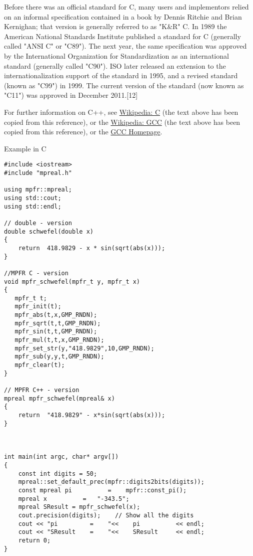 \vpara
Before there was an official standard for C, many users and implementors relied on an informal specification contained in a book by Dennis Ritchie and Brian Kernighan; that version is generally referred to as "K\&R" C. In 1989 the American National Standards Institute published a standard for C (generally called "ANSI C" or "C89"). The next year, the same specification was approved by the International Organization for Standardization as an international standard (generally called "C90"). ISO later released an extension to the internationalization support of the standard in 1995, and a revised standard (known as "C99") in 1999. The current version of the standard (now known as "C11") was approved in December 2011.[12]


\vpara
For further information on C++, see \href{http://en.wikipedia.org/wiki/C_(programming_language)}{Wikipedia: C} (the text above has been copied from this reference), or the  \href{http://en.wikipedia.org/wiki/GNU_Compiler_Collection}{Wikipedia: GCC} (the text above has been copied from this reference), or the  \href{http://gcc.gnu.org/}{GCC Homepage}.



\vpara
Example in C


\begin{lstlisting}
#include <iostream>
#include "mpreal.h"

using mpfr::mpreal;    
using std::cout;
using std::endl;

// double - version
double schwefel(double x)
{
    return  418.9829 - x * sin(sqrt(abs(x)));
}
 
//MPFR C - version
void mpfr_schwefel(mpfr_t y, mpfr_t x)
{
   mpfr_t t;
   mpfr_init(t);
   mpfr_abs(t,x,GMP_RNDN);
   mpfr_sqrt(t,t,GMP_RNDN);
   mpfr_sin(t,t,GMP_RNDN);
   mpfr_mul(t,t,x,GMP_RNDN);
   mpfr_set_str(y,"418.9829",10,GMP_RNDN);
   mpfr_sub(y,y,t,GMP_RNDN);
   mpfr_clear(t);
}

// MPFR C++ - version
mpreal mpfr_schwefel(mpreal& x)
{
    return  "418.9829" - x*sin(sqrt(abs(x)));
}



int main(int argc, char* argv[])
{
    const int digits = 50; 
    mpreal::set_default_prec(mpfr::digits2bits(digits));
    const mpreal pi          =    mpfr::const_pi();
	mpreal x          =   "-343.5"; 
    mpreal SResult = mpfr_schwefel(x);
    cout.precision(digits);    // Show all the digits
    cout << "pi         =    "<<    pi          << endl;    
    cout << "SResult    =    "<<    SResult     << endl;   
    return 0;
}
\end{lstlisting}



